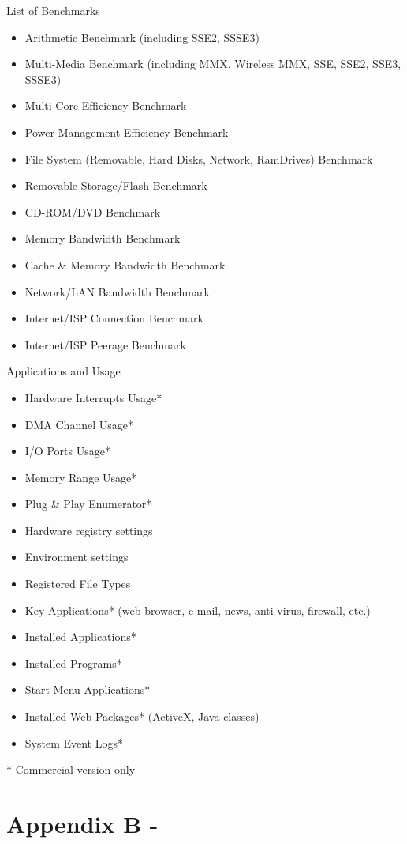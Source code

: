 List of Benchmarks
\begin{itemize}
    \item Arithmetic Benchmark (including SSE2, SSSE3)
    \item Multi-Media Benchmark (including MMX, Wireless MMX, SSE, SSE2, SSE3, SSSE3)
    \item Multi-Core Efficiency Benchmark
    \item Power Management Efficiency Benchmark
    \item File System (Removable, Hard Disks, Network, RamDrives) Benchmark
    \item Removable Storage/Flash Benchmark
    \item CD-ROM/DVD Benchmark
    \item Memory Bandwidth Benchmark
    \item Cache \& Memory Bandwidth Benchmark
    \item Network/LAN Bandwidth Benchmark
    \item Internet/ISP Connection Benchmark
    \item Internet/ISP Peerage Benchmark 
\end{itemize}
    
Applications and Usage
\begin{itemize}
    \item Hardware Interrupts Usage*
    \item DMA Channel Usage*
    \item I/O Ports Usage*
    \item Memory Range Usage*
    \item Plug \& Play Enumerator*
    \item Hardware registry settings
    \item Environment settings
    \item Registered File Types
    \item Key Applications* (web-browser, e-mail, news, anti-virus, firewall, etc.)
    \item Installed Applications*
    \item Installed Programs*
    \item Start Menu Applications*
    \item Installed Web Packages* (ActiveX, Java classes)
    \item System Event Logs* 
\end{itemize}
* Commercial version only
    
\section*{Appendix B - } \label{appB:}



